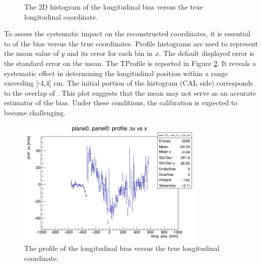 {\begin{figure}[!h]
    \caption[The 2D histogram of the longitudinal bias versus the true coordinate.]{The 2D histogram of the longitudinal bias versus the true longitudinal coordinate.}
    \label{fig:rec2D}
\end{figure}
To assess the systematic impact on the 
reconstructed coordinates, it is essential 
to  of the bias versus 
the true coordinates.
%
Profile histograms are used to represent the 
mean value of $y$ and its error for each bin in $x$. 
The default displayed error is the standard 
error on the mean. 
The TProfile is reported in Figure \ref{fig:profile}. 
It reveals a systematic effect in determining the 
longitudinal position within a range exceeding 
[-4,4] cm. The initial portion of the 
histogram (CAL side) 
corresponds to the overlap of .
%
This plot suggests that the mean may not 
serve as an accurate estimator of the bias. 
Under these conditions, 
the calibration is 
expected to become challenging.
\begin{figure}[!h]
    \centering
    \includegraphics[width=0.8\textwidth]{figures/png/panel_00_x_bias_vs_x_prof.png}
    \caption[The profile of the longitudinal bias versus the true longitudinal coordinate.]{The profile of the longitudinal bias versus the true longitudinal coordinate.}
    \label{fig:profile}
\end{figure}

}
